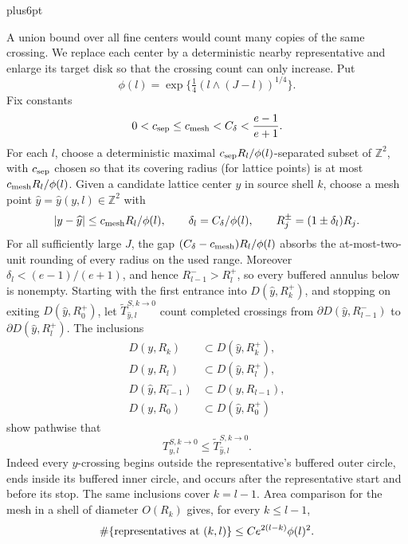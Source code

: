 \documentclass[12pt,reqno]{amsart}
\makeatletter
\theoremstyle{plain}
\theoremstyle{definition}
\theoremstyle{remark}
\renewenvironment{proof}[1][\proofname]{%
  \par
  \pushQED{\qed}%
  \normalfont
  \topsep6pt plus6pt\relax
  \trivlist
  \item[\hskip\labelsep\slshape #1\@addpunct{.}]%
  \ignorespaces
}{%
  \popQED
  \endtrivlist
  \@endpefalse
}
\DeclareRobustCommand{\qed}{%
  \leavevmode\unskip\penalty9999\hbox{}\nobreak
  \ifmmode
    \makebox[0pt][l]{\qquad\hbox{\qedsymbol}}%
  \else
    \qquad\hbox{\qedsymbol}%
  \fi
}
\renewcommand{\qedsymbol}{\rule[.47pt]{4pt}{6pt}}
\numberwithin{equation}{section}
\makeatother
\begin{document}
\begin{proof}[Proof of Lemma~\ref{lem:buffered-transfer}]
A union bound over all fine centers would count many copies of the same
crossing.  We replace each center by a deterministic nearby representative
and enlarge its target disk so that the crossing count can only increase.  Put
\[
\phi(l)=\exp\{\tfrac14(l\wedge(J-l))^{1/4}\}.
\]
Fix constants
\[
0<c_{\rm sep}\le c_{\rm mesh}<C_\delta<\frac{e-1}{e+1}.
\]
For each $l$, choose a deterministic maximal
$c_{\rm sep}R_l/\phi(l)$-separated subset of $\mathbb Z^2$, with
$c_{\rm sep}$ chosen so that its covering radius (for lattice points) is
at most $c_{\rm mesh}R_l/\phi(l)$.  Given a candidate lattice center
$y$ in source shell $k$, choose a mesh point
$\widehat y=\widehat y(y,l)\in\mathbb Z^2$ with
\[
|y-\widehat y|\le c_{\rm mesh}R_l/\phi(l),\qquad
 \delta_l=C_\delta/\phi(l),\qquad R_j^\pm=(1\pm\delta_l)R_j.
\]
For all sufficiently large $J$, the gap
$(C_\delta-c_{\rm mesh})R_l/\phi(l)$ absorbs the at-most-two-unit
rounding of every radius on the used range.  Moreover
$\delta_l<(e-1)/(e+1)$, and hence
$R_{l-1}^->R_l^+$, so every buffered annulus below is nonempty.
Starting with the first entrance into
$D(\widehat y,R_k^+)$, and stopping on exiting
$D(\widehat y,R_0^+)$, let
$\widetilde T_{\widehat y,l}^{S,k\to0}$ count completed crossings from
$\partial D(\widehat y,R_{l-1}^-)$ to
$\partial D(\widehat y,R_l^+)$.  The inclusions
\begin{equation}
\begin{split}
 D(y,R_k)&\subset D(\widehat y,R_k^+),\\
 D(y,R_l)&\subset D(\widehat y,R_l^+),\\
 D(\widehat y,R_{l-1}^-)&\subset D(y,R_{l-1}),\\
 D(y,R_0)&\subset D(\widehat y,R_0^+)
\end{split}\label{eq:ct-transfer-45d0}
\end{equation}
show pathwise that
\begin{equation}
T_{y,l}^{S,k\to0}
       \le\widetilde T_{\widehat y,l}^{S,k\to0}.\label{eq:ct-transfer-45d1}
\end{equation}
Indeed every $y$-crossing begins outside the representative's buffered
outer circle, ends inside its buffered inner circle, and occurs after the
representative start and before its stop.  The same inclusions cover
$k=l-1$.  Area comparison for the mesh in a shell of diameter
$O(R_k)$ gives, for every $k\le l-1$,
\begin{equation}
\#\{\hbox{representatives at }(k,l)\}
 \le C e^{2(l-k)}\phi(l)^2.\label{eq:ct-transfer-45d}
\end{equation}

\end{proof}
\end{document}

